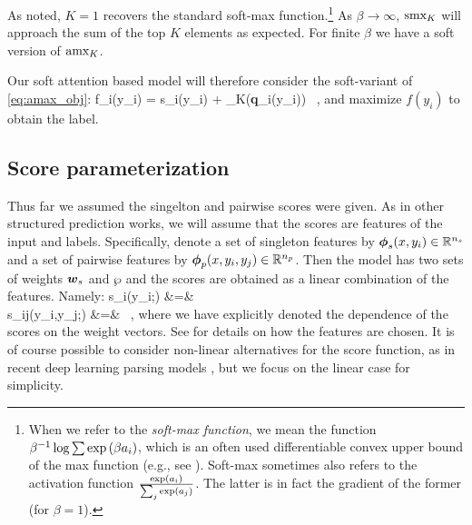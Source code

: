 As noted, $K=1$ recovers the standard soft-max function.\footnote{When we refer to the {\em soft-max function}, we mean the function $\beta^{-1}\log\sum \exp\left({\beta a_i}\right)$, which is an often used differentiable convex upper bound of the max function (e.g., see \cite{gimpel2010softmax}). Soft-max sometimes
also refers to the activation function $\frac{\exp\left({a_i}\right)}{\sum_{j} \exp\left({a_j}\right)}$. The latter is in fact the gradient of the former (for $\beta=1$). }
As $\beta \to \infty$, $\text{smx}_K$ will approach the sum of the top $K$ elements as expected. For  finite $\beta$ we have a soft version of $\text{amx}_K$.

Our soft attention based model will therefore consider the soft-variant of \eqref{eq:amax_obj}:
\be
f_i(y_i) = s_i(y_i) + \samax_K({\bf q}_{i}(y_i)) ~,
\label{eq:samax_obj}
\ee
and maximize $f(y_i)$ to obtain the label.
 
\subsection{Score parameterization \label{sec:score_param}}
Thus far we assumed the singelton and pairwise scores were given. As in other structured prediction works, we will assume that the scores are features of the input and labels. Specifically, denote a set of singleton features by $\boldsymbol{\phi}_s(x,y_i)\in\mathbb{R}^{n_s}$ and a set of pairwise features by $\boldsymbol{\phi}_p(x,y_i,y_j)\in\mathbb{R}^{n_p}$. Then the model has two sets of weights $\boldsymbol{w}_s$ and $\wp$ and the scores are obtained as a linear combination of the features. Namely:
\bea
s_i(y_i;\ws) &=& \ws\cdot\fs  \\
s_{ij}(y_i,y_j;\wp) &=& \wp\cdot\fp ~,
\eea
where we have explicitly denoted the dependence of the scores on the weight vectors.  See  for details on how the features are chosen. It is of course possible to consider non-linear alternatives for the score function, as in recent deep learning parsing models \cite{chen2014fast,neurosis}, but we focus on the linear case for simplicity.

